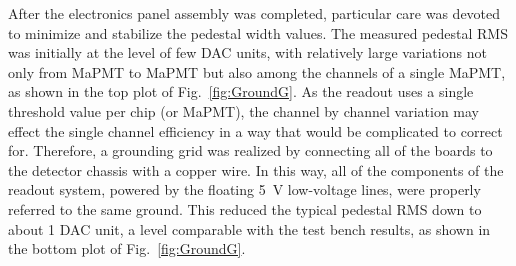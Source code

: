 \documentclass[5p,times,twocolumn]{elsarticle}
\begin{document}
After the electronics panel assembly was completed, particular care was devoted to minimize and stabilize the
pedestal width values. The measured pedestal RMS was initially at the level of few DAC units, with relatively large
variations not only from MaPMT to MaPMT but also among the channels of a single MaPMT, as shown in the top
plot of Fig.~\ref{fig:GroundG}. As the readout uses a single threshold value per chip (or MaPMT), the channel by
channel variation may effect the single channel efficiency in a way that  would be complicated to correct for.
Therefore, a grounding grid was realized by connecting all of the boards to the detector chassis with a copper wire.
In this way, all of the components of the readout system, powered by the floating 5~V low-voltage lines, were properly
referred to the same ground. This reduced the typical pedestal RMS down to about 1 DAC unit, a level comparable
with the test bench results, as shown in the bottom plot of Fig.~\ref{fig:GroundG}.
\end{document}

